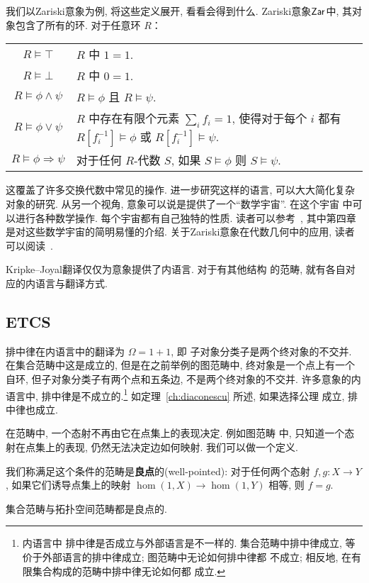 我们以Zariski意象为例, 将这些定义展开, 看看会得到什么.
Zariski意象\(\textnormal{\textsf{Zar}}\)中, 其对象包含了所有的环.
对于任意环 \(R\)：
\begin{center}
\begin{tabular}{c @{\(\color{gray}{}\iff{}\)} p{}}\hline
\(R \vDash \top\) & \(R\) 中 \(1 = 1\).\\
\(R \vDash \bot\) & \(R\) 中 \(0 = 1\).\\
\(R \vDash \phi\wedge\psi\) & \(R \vDash \phi\)
  且 \(R \vDash \psi\).\\
\(R \vDash \phi\vee\psi\) & \(R\) 中存在有限个元素
  \(\sum_i f_i = 1\), 使得对于每个 \(i\) 都有
  \(R[f_i^{-1}] \vDash \phi\) 或
  \(R[f_i^{-1}]\vDash \psi\).\\
\(R \vDash \phi\Rightarrow\psi\) & 对于任何 \(R\)-代数
  \(S\), 如果 \(S \vDash \phi\) 则 \(S \vDash \psi\).\\\hline
\end{tabular}
\end{center}
这覆盖了许多交换代数中常见的操作.
进一步研究这样的语言, 可以大大简化复杂对象的研究.
从另一个视角, 意象可以说是提供了一个“数学宇宙”. 在这个宇宙
中可以进行各种数学操作. 每个宇宙都有自己独特的性质.
读者可以参考~\cite{oliveri:2022:structure},
其中第四章是对这些数学宇宙的简明易懂的介绍.
关于Zariski意象在代数几何中的应用, 读者可以阅读~\cite{blechschmidt:2021:internal}.

Kripke--Joyal翻译仅仅为意象提供了内语言. 对于有其他结构
的范畴, 就有各自对应的内语言与翻译方式.

\subsection{ETCS}
排中律在内语言中的翻译为 \(\Omega = 1 + 1\), 即
子对象分类子是两个终对象的不交并. 在集合范畴中这是成立的,
但是在之前举例的图范畴中, 终对象是一个点上有一个自环,
但子对象分类子有两个点和五条边, 不是两个终对象的不交并.
许多意象的内语言中, 排中律是不成立的.\footnote{内语言中
排中律是否成立与外部语言是不一样的. 集合范畴中排中律成立,
等价于外部语言的排中律成立; 图范畴中无论如何排中律都
不成立; 相反地, 在有限集合构成的范畴中排中律无论如何都
成立.} 如定理~\ref{ch:diaconescu} 所述, 如果选择公理
成立, 排中律也成立.


在范畴中, 一个态射不再由它在点集上的表现决定. 例如图范畴
中, 只知道一个态射在点集上的表现, 仍然无法决定边如何映射.
我们可以做一个定义.
\begin{definition}
我们称满足这个条件的范畴是\textbf{良点}的(well-pointed):
对于任何两个态射 \(f, g : X \to Y\),
如果它们诱导点集上的映射 \(\hom(1, X) \to \hom(1,Y)\)
相等, 则 \(f = g\).
\end{definition}
集合范畴与拓扑空间范畴都是良点的.

